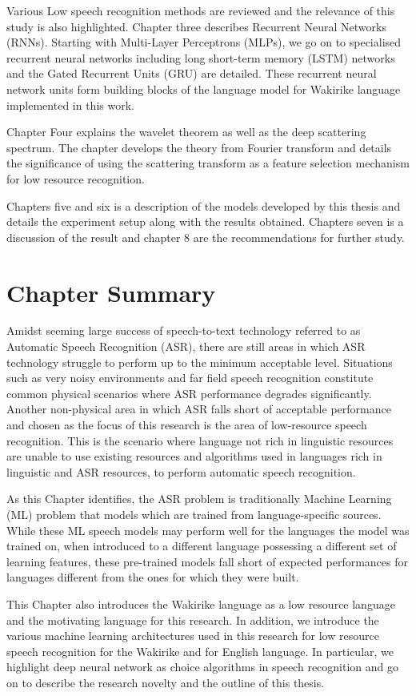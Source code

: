 Various Low speech recognition methods are reviewed and the relevance of this study is also highlighted.  Chapter three describes Recurrent Neural Networks (RNNs). Starting with Multi-Layer Perceptrons (MLPs), we go on to specialised recurrent neural networks including long short-term memory (LSTM) networks and the Gated Recurrent Units (GRU) are detailed. These recurrent neural network units form building blocks of the language model for Wakirike language implemented in this work.

Chapter Four explains the wavelet theorem as well as the deep scattering spectrum. The chapter develops the theory from Fourier transform and details the significance of using the scattering transform as a feature selection mechanism for low resource recognition.  

Chapters five and six is a description of the models developed by this thesis and details the experiment setup along with the results obtained. Chapters seven is a discussion of the result and chapter 8 are the recommendations for further study. 

\section{Chapter Summary}
Amidst seeming large success of speech-to-text technology referred to as Automatic Speech Recognition (ASR), there are still areas in which ASR technology struggle to perform up to the minimum acceptable level.  Situations such as very noisy environments and far field speech recognition constitute common physical scenarios where ASR performance degrades significantly.  Another non-physical area in which ASR falls short of acceptable performance and chosen as the focus of this research is the area of low-resource speech recognition.  This is the scenario where language not rich in linguistic resources are unable to use existing resources and algorithms used in languages rich in linguistic and ASR resources, to perform automatic speech recognition. 

As this Chapter identifies, the ASR problem is traditionally Machine Learning (ML) problem that models which are trained from language-specific sources. While these ML speech models may perform well for the languages the model was trained on, when introduced to a different language possessing a different set of learning features, these pre-trained models fall short of expected performances for languages different from the ones for which they were built.

This Chapter also introduces the Wakirike language as a low resource language and the motivating language for this research.  In addition, we introduce the various machine learning architectures used in this research for low resource speech recognition for the Wakirike and for English language. In particular, we highlight deep neural network as choice algorithms in speech recognition and go on to describe the research novelty and the outline of this thesis.

